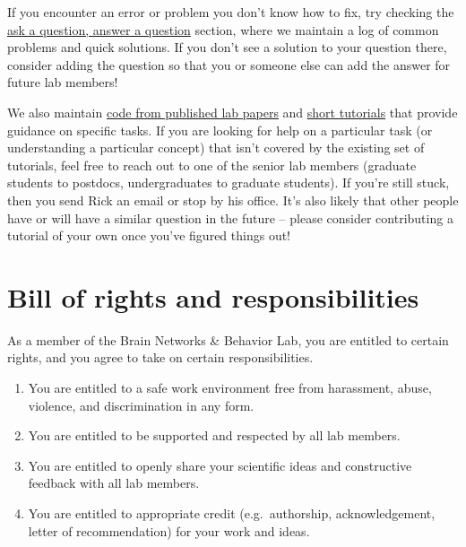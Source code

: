 \documentclass{tufte-book} %
\begin{document}

If you encounter an error or problem you don't know how to fix, try checking the \hyperref[ch:faq]{ask a question, answer a question} section, where we maintain a log of common problems and quick solutions. If you don't see a solution to your question there, consider adding the question so that you or someone else can add the answer for future lab members!

We also maintain \href{https://www.brainnetworkslab.com/coderesources}{code from published lab papers} and \href{https://www.brainnetworkslab.com/internal}{short tutorials} that provide guidance on specific tasks. If you are looking for help on a particular task (or understanding a particular concept) that isn't covered by the existing set of tutorials, feel free to reach out to one of the senior lab members (graduate students to postdocs, undergraduates to graduate students). If you're still stuck, then you send Rick an email or stop by his office. It's also likely that other people have or will have a similar question in the future -- please consider contributing a tutorial of your own once you've figured things out!


\chapter{Bill of rights and responsibilities}\label{ch:billofrights}
 As a member of the Brain Networks \& Behavior Lab, you are entitled to certain rights, and you agree to take on certain responsibilities.

\begin{enumerate}
\item You are entitled to a safe work environment free from harassment, abuse, violence, and discrimination in any form.
 \item You are entitled to be supported and respected by all lab members.
 \item You are entitled to openly share your scientific ideas and constructive feedback with all lab members.
 \item You are entitled to appropriate credit (e.g.\ authorship, acknowledgement, letter of recommendation) for your work and ideas.
\end{enumerate}
\end{document}
